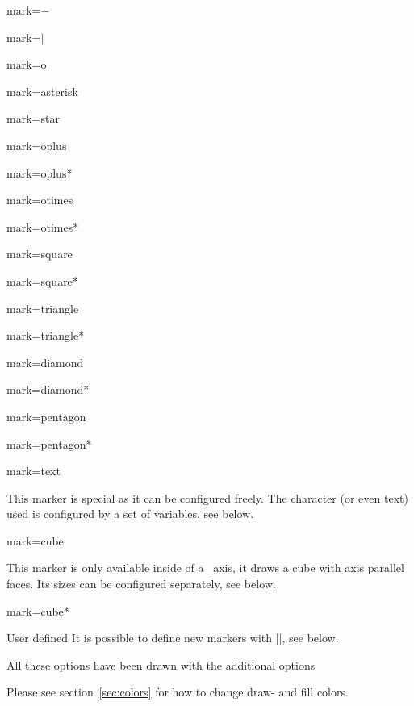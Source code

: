 \begin{longdescription}
	\item[mark=$-$] 
	\item[mark=$\vert$] 
	\item[mark=o] 
	\item[mark=asterisk] 
	\item[mark=star] 
	\item[mark=oplus] 
	\item[mark=oplus*] 
	\item[mark=otimes] 
	\item[mark=otimes*] 
	\item[mark=square] 
	\item[mark=square*] 
	\item[mark=triangle] 
	\item[mark=triangle*] 
	\item[mark=diamond] 
	\item[mark=diamond*] 
	\item[mark=pentagon] 
	\item[mark=pentagon*] 
	\item[mark=text]  

	This marker is special as it can be configured freely. The character (or even text) used is configured by a set of variables, see below.
	\item[mark=cube] 
	
	This marker is only available inside of a \PGFPlots\ axis, it draws a cube with axis parallel faces. Its sizes can be configured separately, see below.
	\item[mark=cube*] 

	\item[User defined] It is possible to define new markers with |\pgfdeclareplotmark|, see below.
\end{longdescription}
All these options have been drawn with the additional options
\begin{codeexample}
\draw[
	gray,
	thin,
	mark options={%
		scale=2,fill=yellow!80!black,draw=black
	}
]
\end{codeexample}
Please see section~\ref{sec:colors} for how to change draw- and fill colors.

